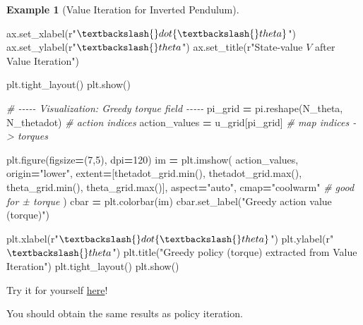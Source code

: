 \documentclass[
]{book}
\newenvironment{Shaded}{\begin{snugshade}}{\end{snugshade}}
\newcommand{\BuiltInTok}[1]{#1}
\newcommand{\CommentTok}[1]{\textcolor[rgb]{0.56,0.35,0.01}{\textit{#1}}}
\newcommand{\DecValTok}[1]{\textcolor[rgb]{0.00,0.00,0.81}{#1}}
\newcommand{\NormalTok}[1]{#1}
\newcommand{\OperatorTok}[1]{\textcolor[rgb]{0.81,0.36,0.00}{\textbf{#1}}}
\newcommand{\StringTok}[1]{\textcolor[rgb]{0.31,0.60,0.02}{#1}}
\newcommand{\VerbatimStringTok}[1]{\textcolor[rgb]{0.31,0.60,0.02}{#1}}
\theoremstyle{definition}
\theoremstyle{definition}
\newtheorem{example}{Example}[chapter]
\theoremstyle{definition}
\theoremstyle{definition}
\theoremstyle{remark}
\begin{document}
\begin{example}[Value Iteration for Inverted Pendulum]
\begin{Shaded}
\begin{Highlighting}[]
\NormalTok{ax.set\_xlabel(}\VerbatimStringTok{r"$\textbackslash{}dot\{\textbackslash{}theta\}$"}\NormalTok{)}
\NormalTok{ax.set\_ylabel(}\VerbatimStringTok{r"$\textbackslash{}theta$"}\NormalTok{)}
\NormalTok{ax.set\_title(}\VerbatimStringTok{r"State{-}value $V$ after Value Iteration"}\NormalTok{)}

\NormalTok{plt.tight\_layout()}
\NormalTok{plt.show()}

\CommentTok{\# {-}{-}{-}{-}{-} Visualization: Greedy torque field {-}{-}{-}{-}{-}}
\NormalTok{pi\_grid }\OperatorTok{=}\NormalTok{ pi.reshape(N\_theta, N\_thetadot)   }\CommentTok{\# action indices}
\NormalTok{action\_values }\OperatorTok{=}\NormalTok{ u\_grid[pi\_grid]             }\CommentTok{\# map indices {-}\textgreater{} torques}

\NormalTok{plt.figure(figsize}\OperatorTok{=}\NormalTok{(}\DecValTok{7}\NormalTok{,}\DecValTok{5}\NormalTok{), dpi}\OperatorTok{=}\DecValTok{120}\NormalTok{)}
\NormalTok{im }\OperatorTok{=}\NormalTok{ plt.imshow(}
\NormalTok{    action\_values,}
\NormalTok{    origin}\OperatorTok{=}\StringTok{"lower"}\NormalTok{,}
\NormalTok{    extent}\OperatorTok{=}\NormalTok{[thetadot\_grid.}\BuiltInTok{min}\NormalTok{(), thetadot\_grid.}\BuiltInTok{max}\NormalTok{(),}
\NormalTok{            theta\_grid.}\BuiltInTok{min}\NormalTok{(), theta\_grid.}\BuiltInTok{max}\NormalTok{()],}
\NormalTok{    aspect}\OperatorTok{=}\StringTok{"auto"}\NormalTok{,}
\NormalTok{    cmap}\OperatorTok{=}\StringTok{"coolwarm"}   \CommentTok{\# good for ± torque}
\NormalTok{)}
\NormalTok{cbar }\OperatorTok{=}\NormalTok{ plt.colorbar(im)}
\NormalTok{cbar.set\_label(}\StringTok{"Greedy action value (torque)"}\NormalTok{)}

\NormalTok{plt.xlabel(}\VerbatimStringTok{r"$\textbackslash{}dot\{\textbackslash{}theta\}$"}\NormalTok{)}
\NormalTok{plt.ylabel(}\VerbatimStringTok{r"$\textbackslash{}theta$"}\NormalTok{)}
\NormalTok{plt.title(}\StringTok{"Greedy policy (torque) extracted from Value Iteration"}\NormalTok{)}
\NormalTok{plt.tight\_layout()}
\NormalTok{plt.show()}
\end{Highlighting}
\end{Shaded}

Try it for yourself \href{https://github.com/ComputationalRobotics/2025-ES-AM-158-LECTURE-CODE/blob/main/pendulum_value_iteration.py}{here}!

You should obtain the same results as policy iteration.
\end{example}

\appendix
\end{document}
